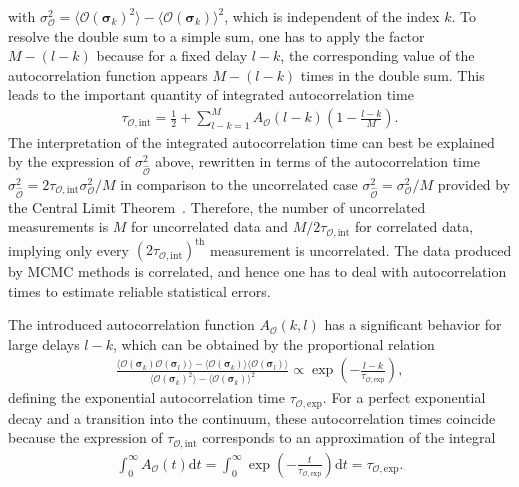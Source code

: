 with $\sigma^2_\mathcal{O}=\langle \mathcal{O}(\bm{\sigma}_k)^2 \rangle\!-\!\langle \mathcal{O}(\bm{\sigma}_k) \rangle^2$, which is independent of the index $k$.
To resolve the double sum to a simple sum, one has to apply the factor $M-(l\!-\!k)$ because for a fixed delay $l\!-\!k$, the corresponding value of the autocorrelation
function appears $M-(l\!-\!k)$ times in the double sum. This leads to the important quantity of integrated autocorrelation time
\begin{align}
    \tau_{\mathcal{O},\mathrm{int}}=\frac{1}{2}\!+\!\sum_{l\!-\!k=1}^MA_\mathcal{O}(l\!-\!k)\left(1-\frac{l\!-\!k}{M}\right).  
    \label{align:autoTimeInt}
\end{align}
The interpretation of the integrated autocorrelation time can best be explained by the expression of $\sigma_{\hat{\mathcal{O}}}^2$ above, rewritten in 
terms of the autocorrelation time $\sigma_{\hat{\mathcal{O}}}^2=2\tau_{\mathcal{O},\mathrm{int}}\sigma_{\mathcal{O}}^2/M$ in comparison to the uncorrelated case 
$\sigma_{\hat{\mathcal{O}}}^2=\sigma_{\mathcal{O}}^2/M$ provided by the Central Limit Theorem~\cite[p.246]{Behrends2013}. Therefore, the number of 
uncorrelated measurements is $M$ for uncorrelated data and $M/2\tau_{\mathcal{O},\mathrm{int}}$ for
correlated data, implying only every $(2\tau_{\mathcal{O},\mathrm{int}})^\text{th}$ measurement is uncorrelated. The data produced by MCMC methods is correlated, 
and hence one has to deal with autocorrelation times to estimate reliable statistical errors.~\cite{Janke2012}

The introduced autocorrelation function $A_\mathcal{O}(k,l)$ has a significant behavior for large delays $l\!-\!k$, which can be obtained by the 
proportional relation 
\begin{align}
    \frac{\langle \mathcal{O}(\bm{\sigma}_k)\mathcal{O}(\bm{\sigma}_l) \rangle - \langle \mathcal{O}(\bm{\sigma}_k) \rangle\langle \mathcal{O}(\bm{\sigma}_l) \rangle}
                            {\langle \mathcal{O}(\bm{\sigma}_k)^2\rangle - \langle \mathcal{O}(\bm{\sigma}_k) \rangle^2}
    \propto\exp\left(-\frac{l-k}{\tau_{\mathcal{O},\mathrm{exp}}}\right),
    \label{align:autoTimeExp}
\end{align}
defining the exponential autocorrelation time $\tau_{\mathcal{O},\mathrm{exp}}$. For a perfect exponential decay and a transition into the continuum, 
these autocorrelation times coincide because the expression of $\tau_{\mathcal{O},\mathrm{int}}$ corresponds to an approximation of the integral
\begin{align*} 
    \int_{0}^\infty A_\mathcal{O}(t)\mathrm{d}t=\int_{0}^\infty \exp\left(-\frac{t}{\tau_{\mathcal{O},\mathrm{exp}}}\right)\mathrm{d}t
                                               =\tau_{\mathcal{O},\mathrm{exp}}.
\end{align*}








